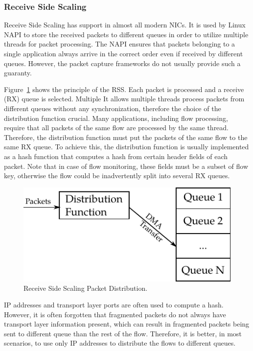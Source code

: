 \subsubsection{Receive Side Scaling}
Receive Side Scaling has support in almost all modern NICs. It is used by Linux NAPI to store the received packets to different queues in order to utilize multiple threads for packet processing. The NAPI ensures that packets belonging to a single application always arrive in the correct order even if received by different queues. However, the packet capture frameworks do not usually provide such a guaranty.

Figure~\ref{fig:rss} shows the principle of the RSS. Each packet is processed and a receive (RX) queue is selected. Multiple It allows multiple threads process packets from different queues without any synchronization, therefore the choice of the distribution function crucial. Many applications, including flow processing, require that all packets of the same flow are processed by the same thread. Therefore, the distribution function must put the packets of the same flow to the same RX queue. To achieve this, the distribution function is usually implemented as a hash function that computes a hash from certain header fields of each packet. Note that in case of flow monitoring, these fields must be a subset of flow key, otherwise the flow could be inadvertently split into several RX queues. 

\begin{figure}[t!]
  \begin{center}
    \includegraphics{figures/c05/rss}
  \end{center}
  \caption{Receive Side Scaling Packet Distribution.}
  \label{fig:rss}
\end{figure}

IP addresses and transport layer ports are often used to compute a hash. However, it is often forgotten that fragmented packets do not always have transport layer information present, which can result in fragmented packets being sent to different queue than the rest of the flow. Therefore, it is better, in most scenarios, to use only IP addresses to distribute the flows to different queues.

